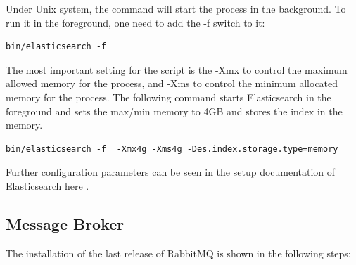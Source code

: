 Under Unix system, the command will start the process in the background. To run it in the foreground, one need to add the -f switch to it:
\begin{code}
\begin{verbatim}
bin/elasticsearch -f
\end{verbatim}
\end{code}

The most important setting for the script is the -Xmx to control the maximum allowed memory for the process, and -Xms to control the minimum allocated memory for the process. The following command starts Elasticsearch in the foreground and sets the max/min memory to 4GB and stores the index in the memory. 
\begin{code}
\begin{verbatim}
bin/elasticsearch -f  -Xmx4g -Xms4g -Des.index.storage.type=memory
\end{verbatim}
\end{code}

Further configuration parameters can be seen in the setup documentation of Elasticsearch here \cite{elastic_setup}.

\subsection{Message Broker\label{sec:eval_te_mb}}
The installation of the last release of RabbitMQ is shown in the following steps:

